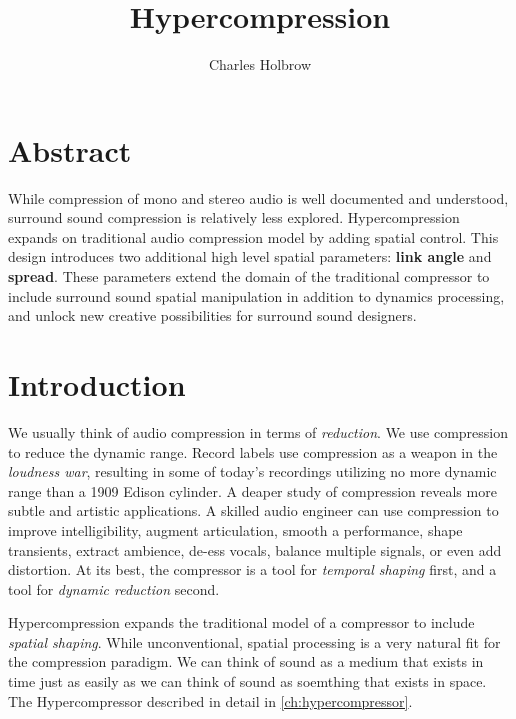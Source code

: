 \documentclass{tufte-book}
\title{Hypercompression}
\author{Charles Holbrow}
\newcommand{\TODO}[1]{\textcolor{red}{\bf TODO:#1}\xspace}
\newcommand{\thesis}{Hypercompression\xspace}
\begin{document}
\frontmatter

\maketitle

\tableofcontents

\mainmatter

\chapter*{Abstract}
\label{ch:abstract}

\marginnote{\TODO{ Abstract is copy/pasted from another section, and
    should probably be re-written from scratch}} While compression of
mono and stereo audio is well documented and
understood,\cite{Giannoulis2012, Blesser1969} surround sound
compression is relatively less explored.  \thesis expands on
traditional audio compression model by adding spatial control. This
design introduces two additional high level spatial parameters:
\textbf{link angle} and \textbf{spread}. These parameters extend the
domain of the traditional compressor to include surround sound spatial
manipulation in addition to dynamics processing, and unlock new
creative possibilities for surround sound designers.


\cleardoublepage
\chapter{Introduction}
\label{ch:introduction}

We usually think of audio compression in terms of \emph{reduction}. We
use compression to reduce the dynamic range.  Record labels use
compression as a weapon in the \emph{loudness war}\cite{Deruty2014a},
resulting in some of today's recordings utilizing no more dynamic
range than a 1909 Edison cylinder.\cite{Katz2007} A deaper study of
compression reveals more subtle and artistic applications. A skilled
audio engineer can use compression to improve intelligibility, augment
articulation, smooth a performance, shape transients, extract
ambience, de-ess vocals, balance multiple signals, or even add
distortion.\cite{Case2007} At its best, the compressor is a tool for
\emph{temporal shaping} first, and a tool for \emph{dynamic
  reduction} second.

\thesis expands the traditional model of a compressor to include
\emph{spatial shaping}. While unconventional, spatial processing is a
very natural fit for the compression paradigm. We can think of sound
as a medium that exists in time just as easily as we can think of
sound as soemthing that exists in space. The
Hypercompressor described in detail in \autoref{ch:hypercompressor}.
\end{document}
